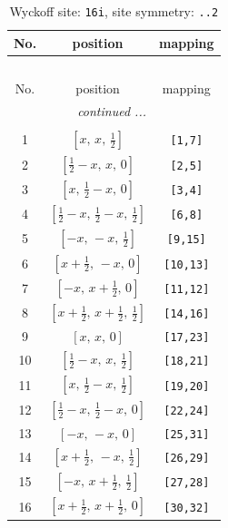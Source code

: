 \documentclass[fleqn,8pt]{jsarticle}
\begin{document}
\begin{longtable}{ccc}
\caption{Wyckoff site: {\tt 16i}, site symmetry: {\tt ..2}}
 \\
 \hline \hline
No. & position & mapping \\ \hline \endfirsthead

\multicolumn{2}{l}{\tablename\ \thetable{}} \\
 \hline \hline
No. & position & mapping \\ \hline \endhead

 \hline \hline
\multicolumn{2}{r}{\footnotesize\it continued ...} \\ \endfoot

 \hline \hline
\multicolumn{2}{r}{} \\ \endlastfoot

1 & $\left[ x,\, x,\, \frac{1}{2} \right]$ & {\tt [1,7]} \\ \hline
2 & $\left[ \frac{1}{2} - x,\, x,\, 0 \right]$ & {\tt [2,5]} \\ \hline
3 & $\left[ x,\, \frac{1}{2} - x,\, 0 \right]$ & {\tt [3,4]} \\ \hline
4 & $\left[ \frac{1}{2} - x,\, \frac{1}{2} - x,\, \frac{1}{2} \right]$ & {\tt [6,8]} \\ \hline
5 & $\left[ - x,\, - x,\, \frac{1}{2} \right]$ & {\tt [9,15]} \\ \hline
6 & $\left[ x + \frac{1}{2},\, - x,\, 0 \right]$ & {\tt [10,13]} \\ \hline
7 & $\left[ - x,\, x + \frac{1}{2},\, 0 \right]$ & {\tt [11,12]} \\ \hline
8 & $\left[ x + \frac{1}{2},\, x + \frac{1}{2},\, \frac{1}{2} \right]$ & {\tt [14,16]} \\ \hline
9 & $\left[ x,\, x,\, 0 \right]$ & {\tt [17,23]} \\ \hline
10 & $\left[ \frac{1}{2} - x,\, x,\, \frac{1}{2} \right]$ & {\tt [18,21]} \\ \hline
11 & $\left[ x,\, \frac{1}{2} - x,\, \frac{1}{2} \right]$ & {\tt [19,20]} \\ \hline
12 & $\left[ \frac{1}{2} - x,\, \frac{1}{2} - x,\, 0 \right]$ & {\tt [22,24]} \\ \hline
13 & $\left[ - x,\, - x,\, 0 \right]$ & {\tt [25,31]} \\ \hline
14 & $\left[ x + \frac{1}{2},\, - x,\, \frac{1}{2} \right]$ & {\tt [26,29]} \\ \hline
15 & $\left[ - x,\, x + \frac{1}{2},\, \frac{1}{2} \right]$ & {\tt [27,28]} \\ \hline
16 & $\left[ x + \frac{1}{2},\, x + \frac{1}{2},\, 0 \right]$ & {\tt [30,32]} \\
\end{longtable}
\end{document}
